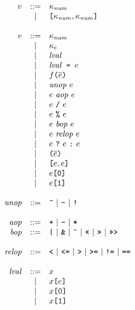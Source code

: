 \documentclass{article}
\newcommand{\ternary}[3]{{#1}\ \mathjs{?}\ {#2}\ \mathjs{:}\ {#3}}
\newcommand{\funcall}[2]{{#1}\mathjs{(}{#2}\mathjs{)}}
\newcommand{\paren}[1]{\mathjs{(}{#1}\mathjs{)}}
\newcommand{\seq}[1]{\overline{{#1}}}
\newcommand{\mathjs}[1]{\mbox{\texttt{{#1}}}}
\newcommand{\getprop}[2]{{#1}\mathjs{[}{#2}\mathjs{]}}
\newcommand{\longlong}[2]{\mathjs{[}{#1},{#2}\mathjs{]}}
\begin{document}
\[
\begin{array}{rcl}
v & ::= & \kappa_{\mathit{num}} \\
  &  |  & \longlong{\kappa_{\mathit{num}}}{\kappa_{\mathit{num}}} \\
\\
e & ::= & \kappa_{\mathit{num}} \\
  &  |  & \kappa_e \\
  &  |  & \mathit{lval} \\
  &  |  & \mathit{lval}\mathjs{ = }e \\
  &  |  & \funcall{f}{\seq{e}} \\
  &  |  & \mathit{unop}\ e \\
  &  |  & e\ \mathit{aop}\ e \\
  &  |  & e\ \mathjs{/}\ e \\
  &  |  & e\ \mathjs{\%}\ e \\
  &  |  & e\ \mathit{bop}\ e \\
  &  |  & e\ \mathit{relop}\ e \\
  &  |  & \ternary{e}{e}{e} \\
  &  |  & \paren{\seq{e}} \\
  &  |  & \longlong{e}{e} \\
  &  |  & \getprop{e}{\mathjs{0}} \\
  &  |  & \getprop{e}{\mathjs{1}} \\
\\
\mathit{unop} & ::= & \mathjs{\~{}} ~|~ \mathjs{-} ~|~ \mathjs{!} \\
\\
\mathit{aop} & ::= & \mathjs{+} ~|~ \mathjs{-} ~|~ \mathjs{*} \\
\mathit{bop} & ::= & \mathjs{|} ~|~ \mathjs{\&} ~|~ \mathjs{\^{}} ~|~ \mathjs{<<} ~|~ \mathjs{>>} ~|~ \mathjs{>>>} \\
\\
\mathit{relop} & ::= & \mathjs{<} ~|~ \mathjs{<=} ~|~ \mathjs{>} ~|~ \mathjs{>=} ~|~ \mathjs{!=} ~|~ \mathjs{==} \\
\\
\mathit{lval} & ::= & x \\
              &  |  & \getprop{x}{e} \\
              &  |  & \getprop{x}{\mathjs{0}} \\
              &  |  & \getprop{x}{\mathjs{1}} \\
\end{array}
\]
\end{document}
